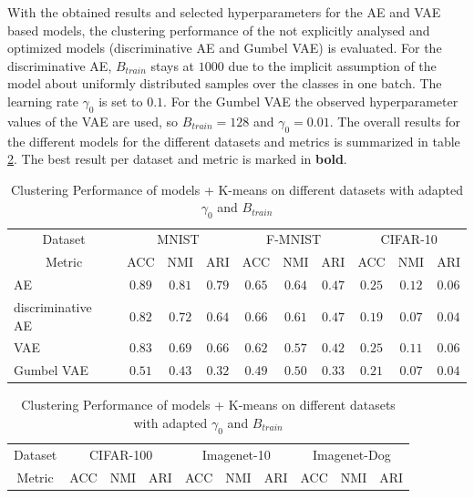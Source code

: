 \documentclass[12pt,DIV14,BCOR12mm,a4paper,footexclude,headinclude,halfparskip-,twoside,openright,cleardoubleempty,idxtotoc,bibtotoc,listtotoc,abstracton]{scrreprt} %
\numberwithin{equation}{chapter}
\begin{document}
With the obtained results and selected hyperparameters for the AE and VAE based models, the clustering performance of the not explicitly analysed and optimized models (discriminative AE and Gumbel VAE) is evaluated. For the discriminative AE, $B_{train}$ stays at $1000$ due to the implicit assumption of the model about uniformly distributed samples over the classes in one batch. The learning rate $\gamma_0$ is set to $0.1$. For the Gumbel VAE the observed hyperparameter values of the VAE are used, so $B_{train}=128$ and $\gamma_0=0.01$. The overall results for the different models for the different datasets and metrics is summarized in table \ref{tab:ClusterPerformance_Models_initLR_BatchSize}. The best result per dataset and metric is marked in \textbf{bold}.
	\begin{table}[htb!]
    		\centering
    		\caption{Clustering Performance of models + K-means on different datasets with adapted $\gamma_0$ and $B_{train}$}
    		\label{tab:ClusterPerformance_Models_initLR_BatchSize}
    		\begin{tabular}{l|ccccccccc}
    			\toprule
    			\multicolumn{1}{c}{Dataset} & \multicolumn{3}{c}{MNIST} & \multicolumn{3}{c}{F-MNIST} & \multicolumn{3}{c}{CIFAR-10}\\
        		\multicolumn{1}{c}{Metric} & ACC & NMI & ARI & ACC & NMI & ARI & ACC & NMI & ARI\\
        		\midrule
    			AE & $\mathbf{0.89}$ & $\mathbf{0.81}$ & $\mathbf{0.79}$ & $0.65$ & $\mathbf{0.64}$ & $\mathbf{0.47}$ & $\mathbf{0.25}$ & $\mathbf{0.12}$ & $\mathbf{0.06}$\\
        		discriminative AE & $0.82$ & $0.72$ & $0.64$ & $\mathbf{0.66}$ & $0.61$ & $\mathbf{0.47}$ & $0.19$ & $0.07$ & $0.04$\\
        		VAE & $0.83$ & $0.69$ & $0.66$ & $0.62$ & $0.57$ & $0.42$ & $\mathbf{0.25}$ & $0.11$ & $\mathbf{0.06}$\\
        		Gumbel VAE & $0.51$ & $0.43$ & $0.32$ & $0.49$ & $0.50$ & $0.33$ & $0.21$ & $0.07$ & $0.04$\\
        		\bottomrule
    		\end{tabular}    		
    		\begin{tabular}{l|ccccccccc}
    			\toprule
    			\multicolumn{1}{c}{Dataset} & \multicolumn{3}{c}{CIFAR-100} & \multicolumn{3}{c}{Imagenet-10} & \multicolumn{3}{c}{Imagenet-Dog}\\
        		\multicolumn{1}{c}{Metric} & ACC & NMI & ARI & ACC & NMI & ARI & ACC & NMI & ARI\\

\end{tabular}
\end{table}
\end{document}
